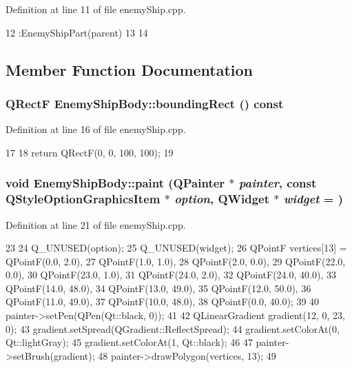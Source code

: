 Definition at line 11 of file enemyShip.cpp.


\begin{DoxyCode}
12         :EnemyShipPart(parent)
13 {
14 }
\end{DoxyCode}


\subsection{Member Function Documentation}
\hypertarget{class_enemy_ship_body_a71c7c2e11c0fbb94d7fa9a7bc049e61e}{
\subsubsection[{boundingRect}]{\setlength{\rightskip}{0pt plus 5cm}QRectF EnemyShipBody::boundingRect () const}}
\label{class_enemy_ship_body_a71c7c2e11c0fbb94d7fa9a7bc049e61e}


Definition at line 16 of file enemyShip.cpp.


\begin{DoxyCode}
17 {
18     return QRectF(0, 0, 100, 100);
19 }
\end{DoxyCode}
\hypertarget{class_enemy_ship_body_a0b951ebac49d2fcdff2e460b050bd82e}{
\subsubsection[{paint}]{\setlength{\rightskip}{0pt plus 5cm}void EnemyShipBody::paint (QPainter $\ast$ {\em painter}, \/  const QStyleOptionGraphicsItem $\ast$ {\em option}, \/  QWidget $\ast$ {\em widget} = {})}}
\label{class_enemy_ship_body_a0b951ebac49d2fcdff2e460b050bd82e}


Definition at line 21 of file enemyShip.cpp.


\begin{DoxyCode}
23 {
24     Q_UNUSED(option);
25     Q_UNUSED(widget);
26     QPointF vertices[13] = {QPointF(0.0, 2.0),
27                             QPointF(1.0, 1.0),
28                             QPointF(2.0, 0.0),
29                             QPointF(22.0, 0.0),
30                             QPointF(23.0, 1.0),
31                             QPointF(24.0, 2.0),
32                             QPointF(24.0, 40.0),
33                             QPointF(14.0, 48.0),
34                             QPointF(13.0, 49.0),
35                             QPointF(12.0, 50.0),
36                             QPointF(11.0, 49.0),
37                             QPointF(10.0, 48.0),
38                             QPointF(0.0, 40.0)};
39     
40     painter->setPen(QPen(Qt::black, 0));
41 
42     QLinearGradient gradient(12, 0, 23, 0);
43     gradient.setSpread(QGradient::ReflectSpread);
44     gradient.setColorAt(0, Qt::lightGray);
45     gradient.setColorAt(1, Qt::black);
46 
47     painter->setBrush(gradient);
48     painter->drawPolygon(vertices, 13);
49 }
\end{DoxyCode}


